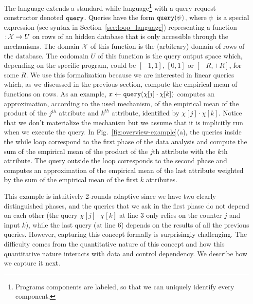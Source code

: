 The {\THESYSTEM} language extends a standard while language\footnote{Programs components are labeled, so that we can uniquely identify every component.} with a query request constructor denoted ${\tt query}$.
 Queries have the form ${\tt query}(\psi)$, where $\psi$ is a special expression (see syntax in Section~\ref{sec:loop_language}) 
representing a function $: \mathcal{X} \to U$ on rows of an hidden database that is only accessible through the mechanisms. The domain $\mathcal{X}$ of this function is the (arbitrary) domain of rows of the database. The codomain $U$ of this function is the query output space which, depending on the specific program, could be $[-1,1]$, $[0,1]$ or $[-R,+R]$, for some $R$. We use this formalization because we are interested in linear queries which, as we discussed in the previous section, compute the empirical mean of functions on rows.
 As an example, $x \leftarrow {\tt query}(\chi[j] \cdot \chi[k])$ computes an approximation, according to the used mechanism, of the empirical mean of the product of the $j^{th}$ attribute and $k^{th}$ attribute, identified by $\chi[j] \cdot \chi[k]$. Notice that we don't materialize the mechanism but we assume that it is implicitly run when we execute the query. 
 In Fig.~\ref{fig:overview-example}(a), the queries inside the while loop correspond to the first phase of the data analysis and compute the sum of the empirical mean of
the product of the $j$th attribute with the $k$th attribute. 
The query outside the loop corresponds to the second phase and computes an approximation of the empirical mean of the last attribute weighted by the sum of the empirical mean of the first $k$ attributes.


This example is intuitively 2-rounds adaptive since we have two clearly distinguished phases, and the queries that we ask in the first phase do not depend on each other (the query $\chi[j] \cdot \chi[k]$ at line $3$ only relies on the counter $j$ and input $k$), while the last query 
(at line 6) depends on the results of all the previous queries. 
However, capturing this concept formally is surprisingly challenging. The difficulty comes from the quantitative nature of this concept and how this quantitative nature interacts with data and control dependency. We describe how we capture it next. 

